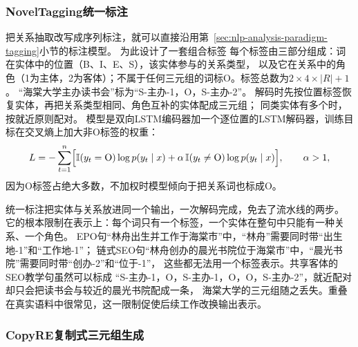 \subsubsection{NovelTagging统一标注}
\label{sec:nlp-extraction-noveltagging}

把关系抽取改写成序列标注，就可以直接沿用第~\ref{sec:nlp-analysis-paradigm-tagging}小节的标注模型。
\citeauthor{zheng2017noveltagging}为此设计了一套组合标签
每个标签由三部分组成：词在实体中的位置（B、I、E、S），该实体参与的关系类型，
以及它在关系中的角色（1为主体，2为客体）；不属于任何三元组的词标O。标签总数为$2\times4\times|R|+1$。
“海棠大学主办读书会”标为“S-主办-1，O，S-主办-2”。
解码时先按位置标签恢复实体，再把关系类型相同、角色互补的实体配成三元组；
同类实体有多个时，按就近原则配对。
模型是双向LSTM编码器加一个逐位置的LSTM解码器，训练目标在交叉熵上加大非O标签的权重：
\[
  L=-\sum_{t=1}^{n}\Bigl[\mathbb{I}(y_t=\mathrm{O})\log p(y_t\mid x)
    +\alpha\,\mathbb{I}(y_t\neq\mathrm{O})\log p(y_t\mid x)\Bigr],\qquad\alpha>1,
\]
因为O标签占绝大多数，不加权时模型倾向于把关系词也标成O。

统一标注把实体与关系放进同一个输出，一次解码完成，免去了流水线的两步。
它的根本限制在表示上：每个词只有一个标签，一个实体在整句中只能有一种关系、一个角色。
EPO句“林舟出生并工作于海棠市”中，“林舟”需要同时带“出生地-1”和“工作地-1”；
链式SEO句“林舟创办的晨光书院位于海棠市”中，“晨光书院”需要同时带“创办-2”和“位于-1”，
这些都无法用一个标签表示。共享客体的SEO教学句虽然可以标成
“S-主办-1，O，S-主办-1，O，O，S-主办-2”，就近配对却只会把读书会与较近的晨光书院配成一条，
海棠大学的三元组随之丢失。重叠在真实语料中很常见，这一限制促使后续工作改换输出表示。

\subsubsection{CopyRE复制式三元组生成}
\label{sec:nlp-extraction-copyre}

